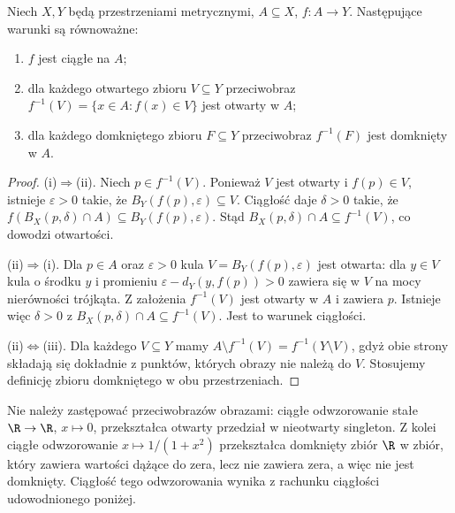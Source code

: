 \begin{twierdzenie}
\label{ma1:thm:continuity-preimages}
Niech $X,Y$ będą przestrzeniami metrycznymi, $A\subseteq X$, $f:A\to Y$. Następujące warunki są równoważne:
\begin{enumerate}[label=(\roman*)]
\item $f$ jest ciągłe na $A$;
\item dla każdego otwartego zbioru $V\subseteq Y$ przeciwobraz $f^{-1}(V)=\{x\in A:f(x)\in V\}$ jest otwarty w $A$;
\item dla każdego domkniętego zbioru $F\subseteq Y$ przeciwobraz $f^{-1}(F)$ jest domknięty w $A$.
\end{enumerate}
\end{twierdzenie}
\begin{proof}
(i)$\Rightarrow$(ii). Niech $p\in f^{-1}(V)$. Ponieważ $V$ jest otwarty i $f(p)\in V$, istnieje $\varepsilon>0$ takie, że $B_Y(f(p),\varepsilon)\subseteq V$. Ciągłość daje $\delta>0$ takie, że $f(B_X(p,\delta)\cap A)\subseteq B_Y(f(p),\varepsilon)$. Stąd $B_X(p,\delta)\cap A\subseteq f^{-1}(V)$, co dowodzi otwartości.

(ii)$\Rightarrow$(i). Dla $p\in A$ oraz $\varepsilon>0$ kula $V=B_Y(f(p),\varepsilon)$ jest otwarta: dla $y\in V$ kula o środku $y$ i promieniu $\varepsilon-d_Y(y,f(p))>0$ zawiera się w $V$ na mocy nierówności trójkąta. Z założenia $f^{-1}(V)$ jest otwarty w $A$ i zawiera $p$. Istnieje więc $\delta>0$ z $B_X(p,\delta)\cap A\subseteq f^{-1}(V)$. Jest to warunek ciągłości.

(ii)$\Leftrightarrow$(iii). Dla każdego $V\subseteq Y$ mamy $A\setminus f^{-1}(V)=f^{-1}(Y\setminus V)$, gdyż obie strony składają się dokładnie z punktów, których obrazy nie należą do $V$. Stosujemy definicję zbioru domkniętego w obu przestrzeniach.
\end{proof}
Nie należy zastępować przeciwobrazów obrazami: ciągłe odwzorowanie stałe $\R\to\R$, $x\mapsto0$, przekształca otwarty przedział w nieotwarty singleton. Z kolei ciągłe odwzorowanie $x\mapsto 1/(1+x^2)$ przekształca domknięty zbiór $\R$ w zbiór, który zawiera wartości dążące do zera, lecz nie zawiera zera, a więc nie jest domknięty. Ciągłość tego odwzorowania wynika z rachunku ciągłości udowodnionego poniżej.


